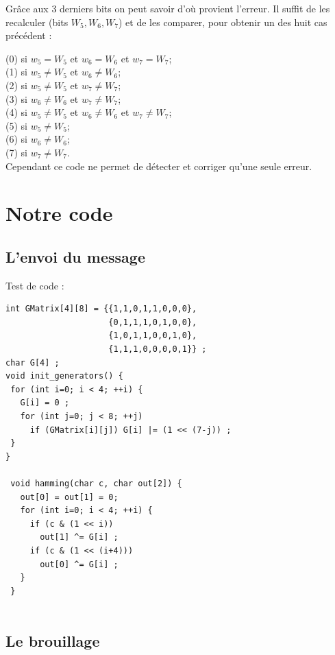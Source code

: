 Grâce aux 3 derniers bits on peut savoir d'où provient l'erreur. Il suffit de les recalculer (bits $W_5, W_6, W_7$) et de les comparer, pour obtenir un des huit cas précédent :

  (0) si $w_5 = W_5$ et $w_6 = W_6$ et $w_7 = W_7$;\\
  (1) si $w_5 \ne W_5$ et $w_6 \ne W_6$; \\
  (2) si $w_5 \ne W_5$ et $w_7 \ne W_7$; \\
  (3) si $w_6 \ne W_6$ et $w_7 \ne W_7$; \\
  (4) si $w_5 \ne W_5$ et $w_6 \ne W_6$ et $w_7 \ne W_7$; \\
  (5) si $w_5 \ne W_5$; \\
  (6) si $w_6 \ne W_6$; \\
  (7) si $w_7 \ne W_7$. \\

Cependant ce code ne permet de détecter et corriger qu'une seule erreur.

\section{Notre code}
\label{sec:Notre code}

\subsection{L'envoi du message}
\label{sub:L'envoi du message}

Test de code :

\begin{verbatim}
int GMatrix[4][8] = {{1,1,0,1,1,0,0,0},
                     {0,1,1,1,0,1,0,0},
                     {1,0,1,1,0,0,1,0},
                     {1,1,1,0,0,0,0,1}} ;
char G[4] ;
void init_generators() {
 for (int i=0; i < 4; ++i) {
   G[i] = 0 ;
   for (int j=0; j < 8; ++j)
     if (GMatrix[i][j]) G[i] |= (1 << (7-j)) ;
 }
}

 void hamming(char c, char out[2]) {
   out[0] = out[1] = 0;
   for (int i=0; i < 4; ++i) {
     if (c & (1 << i))
       out[1] ^= G[i] ;
     if (c & (1 << (i+4)))
       out[0] ^= G[i] ;
   }
 }


\end{verbatim}



\subsection{Le brouillage}
\label{sub:brouillage}

